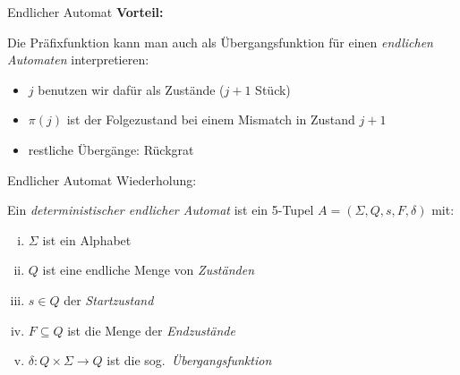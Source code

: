 \documentclass[xcolor=dvipsnames, aspectratio=169]{beamer}
\begin{document}
\begin{frame}{Endlicher Automat}
\textbf{Vorteil:}\medskip

Die Präfixfunktion kann man auch als Übergangsfunktion für einen \emph{endlichen Automaten} interpretieren:\medskip

\begin{itemize}
\item $j$ benutzen wir dafür als Zustände ($j+1$ Stück)
\item $\pi(j)$ ist der Folgezustand bei einem Mismatch in Zustand $j+1$
\item restliche Übergänge: \glqq Rückgrat\grqq
\end{itemize}
\end{frame}

\begin{frame}{Endlicher Automat}
Wiederholung:\medskip

\begin{defi}
Ein \emph{deterministischer endlicher Automat} ist ein 5-Tupel $A=(\Sigma, Q, s, F, \delta)$ mit:
\begin{enumerate}[(i)]
\item $\Sigma$ ist ein Alphabet
\item $Q$ ist eine endliche Menge von \emph{Zuständen}
\item $s\in Q$ der \emph{Startzustand}
\item $F\subseteq Q$ ist die Menge der \emph{Endzustände} 
\item $\delta\colon Q\times\Sigma\to Q$ ist die sog.\ \emph{Übergangsfunktion}
\end{enumerate}
\end{defi}
\end{frame}
\end{document}
